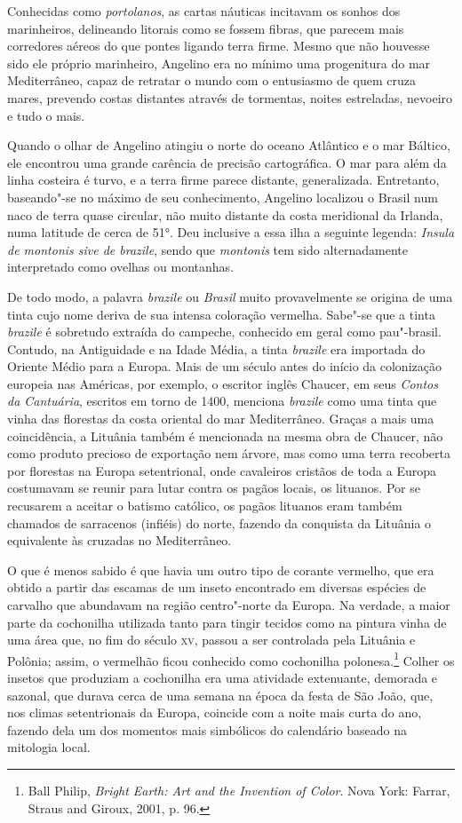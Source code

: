 Conhecidas como \textit{portolanos}, as cartas náuticas
incitavam os sonhos dos marinheiros, delineando litorais como se fossem
fibras, que parecem mais corredores aéreos do que pontes ligando terra
firme. Mesmo que não houvesse sido ele próprio marinheiro, Angelino era
no mínimo uma progenitura do mar Mediterrâneo, capaz de retratar o mundo
com o entusiasmo de quem cruza mares, prevendo costas distantes através
de tormentas, noites estreladas, nevoeiro e tudo o mais. 

Quando o olhar
de Angelino atingiu o norte do oceano Atlântico e o mar Báltico, ele
encontrou uma grande carência de precisão cartográfica. O mar para além
da linha costeira é turvo, e a terra firme parece distante,
generalizada. Entretanto, baseando"-se no máximo de seu conhecimento,
Angelino localizou o Brasil num naco de terra quase circular, não muito
distante da costa meridional da Irlanda, numa latitude de cerca de 51°.
Deu inclusive a essa ilha a seguinte legenda: \textit{Insula de montonis
sive de brazile}, sendo que \textit{montonis} tem sido alternadamente
interpretado como ovelhas ou montanhas.

De todo modo, a palavra \textit{brazile} ou \textit{Brasil} muito
provavelmente se origina de uma tinta cujo nome deriva de sua intensa
coloração vermelha. Sabe"-se que a tinta \textit{brazile} é sobretudo
extraída do campeche, conhecido em geral como pau"-brasil. Contudo, na
Antiguidade e na Idade Média, a tinta \textit{brazile} era importada do
Oriente Médio para a Europa. Mais de um século antes do início da
colonização europeia nas Américas, por exemplo, o escritor inglês
Chaucer, em seus \textit{Contos da Cantuária}, escritos em torno de 1400,
menciona \textit{brazile} como uma tinta que vinha das florestas da costa
oriental do mar Mediterrâneo. Graças a mais uma coincidência, a Lituânia
também é mencionada na mesma obra de Chaucer, não como produto precioso
de exportação nem árvore, mas como uma terra recoberta por florestas na
Europa setentrional, onde cavaleiros cristãos de toda a Europa
costumavam se reunir para lutar contra os pagãos locais, os lituanos.
Por se recusarem a aceitar o batismo católico, os pagãos lituanos eram
também chamados de sarracenos (infiéis) do norte, fazendo da conquista
da Lituânia o equivalente às cruzadas no Mediterrâneo. 

O que é menos
sabido é que havia um outro tipo de corante vermelho, que era obtido a
partir das escamas de um inseto encontrado em diversas espécies de
carvalho que abundavam na região centro"-norte da Europa. Na verdade, a
maior parte da cochonilha utilizada tanto para tingir tecidos como na
pintura vinha de uma área que, no fim do século \textsc{xv}, passou a ser
controlada pela Lituânia e Polônia; assim, o vermelhão ficou conhecido
como cochonilha polonesa.\footnote{Ball Philip, \textit{Bright Earth:
  Art and the Invention of Color}. Nova York: Farrar, Straus and Giroux,
  2001, p. 96.} Colher os insetos que produziam a cochonilha era uma
atividade extenuante, demorada e sazonal, que durava cerca de uma semana
na época da festa de São João, que, nos climas setentrionais da Europa,
coincide com a noite mais curta do ano, fazendo dela um dos momentos
mais simbólicos do calendário baseado na mitologia local. 

